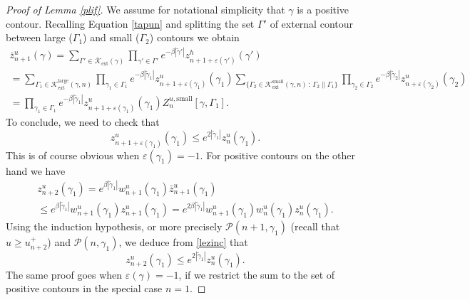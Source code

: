 \documentclass[JEP,XML,SOM,Unicode, NoFloatCountersInSection]{cedram}
\let\mathcal\mathscr
\newcommand{\sep}{\,:\,}
\numberwithin{equation}{section}
\theoremstyle{plain}
\theoremstyle{definition}
\newcommand{\ext}{\mathrm{ext}}
\newcommand{\sm}{\mathrm{small}}
\newcommand{\larg}{\mathrm{large}}
\newcommand{\cP}{{\ensuremath{\mathcal P}} }
\newcommand{\cK}{{\ensuremath{\mathcal K}} }
\newcommand{\gb}{\beta}
\newcommand{\gep}{\varepsilon}
\newcommand{\gG}{\Gamma}
\begin{document}
\begin{proof}[Proof of Lemma \ref{plif}]
We assume for notational simplicity that $\gamma$ is a positive contour.
Recalling Equation \eqref{tapun} and splitting the set $\gG'$ of external contour between large ($\gG_1$) and small ($\gG_2$) contours we obtain
\begin{multline*}
\bar z^{u}_{n+1}(\gamma)= \sum_{\gG'\in \bar \cK_{\ext}(\gamma)}\prod_{\gamma'\in \gG'} e^{-\gb |\tilde \gamma'|} z^h_{n+1+\gep(\gamma')}(\gamma') \\
=
\!\!\!\!\!\sum_{\gG_1\in \cK^{\larg}_{\ext}(\gamma,n)}
\prod_{\gamma_1\in \gG_1} e^{-\gb |\tilde \gamma_1|} z^u_{n+1+\gep(\gamma_1)}(\gamma_1) \!\!\!\!\!\!\!\!
\sum_{\{ \gG_2 \in \cK^{\sm}_{\ext}(\gamma,n) \sep \gG_2 \parallel \gG_1\}} \prod_{\gamma_2\in \gG_2 } e^{-\gb |\tilde\gamma_2|} z^u_{n+\gep(\gamma_2)}(\gamma_2)\\
= \prod_{\gamma_1\in \gG_1} e^{-\gb |\tilde \gamma_1|} z^u_{n+1+\gep(\gamma_1)}(\gamma_1) Z^{u,\sm}_{n}[\gamma, \gG_1].
\end{multline*}
To conclude, we need to check that
\begin{equation*}
z^u_{n+1+\gep(\gamma_1)}(\gamma_1)\le e^{2|\tilde \gamma_1|}z^u_{n}(\gamma_1).
\end{equation*}
This is of course obvious when $\gep(\gamma_1)=-1$. For positive contours on the other hand we have
\begin{multline}\label{lezinc}
z^u_{n+2}(\gamma_1)= e^{\gb | \tilde \gamma_1|}w^u_{n+1}(\gamma_1) \bar z^u_{n+1}(\gamma_1)\\
\le
e^{\gb | \tilde \gamma_1|}w^u_{n+1}(\gamma_1) z^u_{n+1}(\gamma_1)= e^{2\gb | \tilde \gamma_1|}w^u_{n+1}(\gamma_1) w^u_{n}(\gamma_1) z^u_{n}(\gamma_1).
\end{multline}
Using the induction hypothesis, or more precisely $\cP(n+1,\gamma_1)$ (recall that $u\ge u^+_{n+2}$) and $\cP(n,\gamma_1)$, we deduce from \eqref{lezinc} that
\begin{equation*}
z^u_{n+2}(\gamma_1)\le e^{2|\tilde \gamma_1|}z^u_{n}(\gamma_1).
\end{equation*}
The same proof goes when $\gep(\gamma)=-1$, if we restrict the sum to the set of positive contours in the special case $n=1$.
\end{proof}
\end{document}
